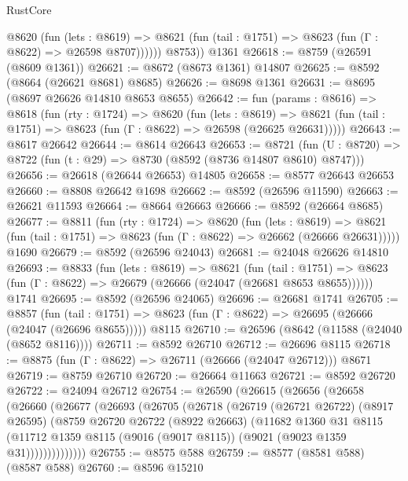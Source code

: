 \begin{lexlean}{RustCore}
\begin{coremodule}
            @8620
              (fun (lets : @8619) =>
              @8621 (fun (tail : @1751) => @8623 (fun (Γ : @8622) => @26598 @8707))))))
        @8753))
    @1361
@26618 := @8759 (@26591 (@8609 @1361))
@26621 := @8672 (@8673 @1361) @14807
@26625 := @8592 (@8664 (@26621 @8681) @8685)
@26626 := @8698 @1361
@26631 := @8695 (@8697 @26626 @14810 @8653 @8655)
@26642 := fun (params : @8616) =>
  @8618
    (fun (rty : @1724) =>
    @8620
      (fun (lets : @8619) =>
      @8621 (fun (tail : @1751) => @8623 (fun (Γ : @8622) => @26598 (@26625 @26631)))))
@26643 := @8617 @26642
@26644 := @8614 @26643
@26653 := @8721
    (fun (U : @8720) => @8722 (fun (t : @29) => @8730 (@8592 (@8736 @14807 @8610) @8747)))
@26656 := @26618 (@26644 @26653) @14805
@26658 := @8577 @26643 @26653
@26660 := @8808 @26642 @1698
@26662 := @8592 (@26596 @11590)
@26663 := @26621 @11593
@26664 := @8664 @26663
@26666 := @8592 (@26664 @8685)
@26677 := @8811
    (fun (rty : @1724) =>
    @8620
      (fun (lets : @8619) =>
      @8621 (fun (tail : @1751) => @8623 (fun (Γ : @8622) => @26662 (@26666 @26631)))))
    @1690
@26679 := @8592 (@26596 @24043)
@26681 := @24048 @26626 @14810
@26693 := @8833
    (fun (lets : @8619) =>
    @8621
      (fun (tail : @1751) =>
      @8623 (fun (Γ : @8622) => @26679 (@26666 (@24047 (@26681 @8653 @8655))))))
    @1741
@26695 := @8592 (@26596 @24065)
@26696 := @26681 @1741
@26705 := @8857
    (fun (tail : @1751) => @8623 (fun (Γ : @8622) => @26695 (@26666 (@24047 (@26696 @8655)))))
    @8115
@26710 := @26596 (@8642 (@11588 (@24040 (@8652 @8116))))
@26711 := @8592 @26710
@26712 := @26696 @8115
@26718 := @8875 (fun (Γ : @8622) => @26711 (@26666 (@24047 @26712))) @8671
@26719 := @8759 @26710
@26720 := @26664 @11663
@26721 := @8592 @26720
@26722 := @24094 @26712
@26754 := @26590
    (@26615
      (@26656
        (@26658
          (@26660
            (@26677
              (@26693
                (@26705
                  (@26718
                    (@26719
                      (@26721 @26722)
                      (@8917 @26595)
                      (@8759
                        @26720
                        @26722
                        (@8922 @26663)
                        (@11682
                          @1360
                          @31
                          @8115
                          (@11712
                            @1359
                            @8115
                            (@9016 (@9017 @8115))
                            (@9021 (@9023 @1359 @31))))))))))))))
@26755 := @8575 @588
@26759 := @8577 (@8581 @588) (@8587 @588)
@26760 := @8596 @15210

\end{coremodule}
\end{lexlean}
